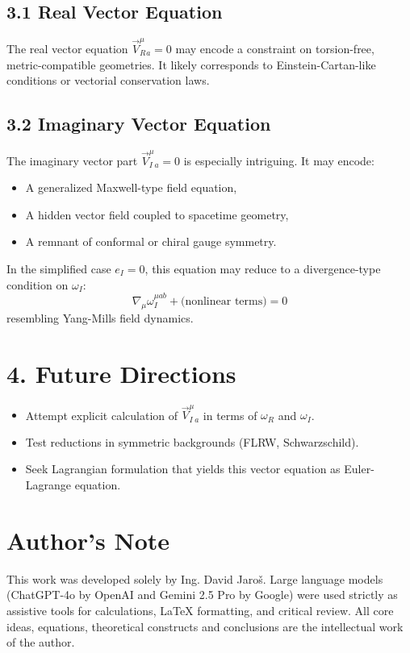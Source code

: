 \documentclass[12pt]{article}
\begin{document}
\subsection*{3.1 Real Vector Equation}

The real vector equation $\vec{V}_R^\mu_a = 0$ may encode a constraint on torsion-free, metric-compatible geometries. It likely corresponds to Einstein-Cartan-like conditions or vectorial conservation laws.

\subsection*{3.2 Imaginary Vector Equation}

The imaginary vector part $\vec{V}_I^\mu_a = 0$ is especially intriguing. It may encode:
\begin{itemize}
  \item A generalized Maxwell-type field equation,
  \item A hidden vector field coupled to spacetime geometry,
  \item A remnant of conformal or chiral gauge symmetry.
\end{itemize}

In the simplified case $e_I = 0$, this equation may reduce to a divergence-type condition on $\omega_I$:
\[
\nabla_\mu \omega_I^{\mu ab} + \text{(nonlinear terms)} = 0
\]
resembling Yang-Mills field dynamics.

\section*{4. Future Directions}

\begin{itemize}
  \item Attempt explicit calculation of $\vec{V}_I^\mu_a$ in terms of $\omega_R$ and $\omega_I$.
  \item Test reductions in symmetric backgrounds (FLRW, Schwarzschild).
  \item Seek Lagrangian formulation that yields this vector equation as Euler-Lagrange equation.
\end{itemize}


\section*{Author's Note}

This work was developed solely by Ing. David Jaroš.  
Large language models (ChatGPT-4o by OpenAI and Gemini 2.5 Pro by Google) were used strictly as assistive tools for calculations, LaTeX formatting, and critical review.  
All core ideas, equations, theoretical constructs and conclusions are the intellectual work of the author.
\end{document}
